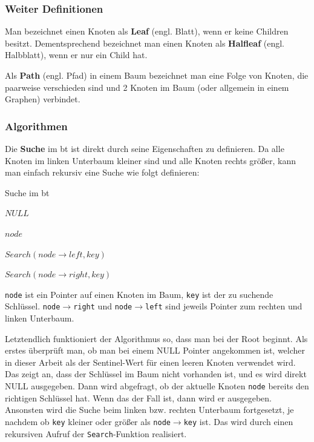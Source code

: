 \documentclass[11pt]{article}
\newcommand{\lstin}[1]{\lstinline[language=C]{#1}}
\begin{document}
\subsubsection{Weiter Definitionen}
Man bezeichnet einen Knoten als \textbf{Leaf} (engl. Blatt), wenn er keine Children besitzt. \cite[S. 36]{aic}
Dementsprechend bezeichnet man einen Knoten als \textbf{Halfleaf} (engl. Halbblatt), wenn er nur ein Child hat. 

Als \textbf{Path} (engl. Pfad) in einem Baum bezeichnet man eine Folge von Knoten, die paarweise verschieden sind und 2 Knoten im Baum (oder allgemein in einem Graphen) verbindet. \cite[S. 36]{aic}

\subsubsection{Algorithmen}

Die \textbf{Suche} im \gls{bt} ist direkt durch seine Eigenschaften zu definieren. 
Da alle Knoten im linken Unterbaum kleiner sind und alle Knoten rechts größer, kann man einfach rekursiv eine Suche wie folgt definieren:

\begin{algorithm}
  \caption{Suche im \gls{bt}}
  \begin{algorithmic}[1]
      
      \Return $NULL$
    \EndIf
      
      \Return $node$
      
      \Return $Search(node \rightarrow left, key)$
    \Else
      
      \Return $Search(node \rightarrow right, key)$
    \EndIf
  \EndProcedure
  \end{algorithmic}
\end{algorithm}

\lstin{node} ist ein Pointer auf einen Knoten im Baum, \lstin{key} ist der zu suchende Schlüssel.
\lstin{node}$\rightarrow$\lstin{right} und \lstin{node}$\rightarrow$\lstin{left} 
sind jeweils Pointer zum rechten und linken Unterbaum.

Letztendlich funktioniert der Algorithmus so, dass man bei der Root beginnt. 
Als erstes überprüft man, ob man bei einem NULL Pointer angekommen ist, welcher in dieser Arbeit als der Sentinel-Wert für einen leeren Knoten verwendet wird. 
Das zeigt an, dass der Schlüssel im Baum nicht vorhanden ist, und es wird direkt NULL ausgegeben.
Dann wird abgefragt, ob der aktuelle Knoten \lstin{node} bereits den richtigen Schlüssel hat. Wenn das der Fall ist, dann wird er ausgegeben.
Ansonsten wird die Suche beim linken bzw. rechten Unterbaum fortgesetzt, je nachdem ob \lstin{key} kleiner oder größer als \lstin{node}$\rightarrow$\lstin{key} ist.
Das wird durch einen rekursiven Aufruf der \lstin{Search}-Funktion realisiert. 
\cite[S. 203]{aic}
\end{document}
